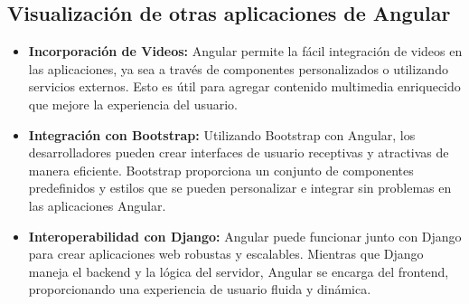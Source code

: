 \documentclass{article}
\begin{document}
  \subsection{Visualización de otras aplicaciones de Angular}
  \begin{itemize}
    \item \textbf{Incorporación de Videos:} Angular permite la fácil integración de videos en las aplicaciones, 
    ya sea a través de componentes personalizados o utilizando servicios externos. Esto es útil para agregar 
    contenido multimedia enriquecido que mejore la experiencia del usuario.
    \item \textbf{Integración con Bootstrap:} Utilizando Bootstrap con Angular, los desarrolladores pueden crear 
    interfaces de usuario receptivas y atractivas de manera eficiente. Bootstrap proporciona un conjunto de componentes 
    predefinidos y estilos que se pueden personalizar e integrar sin problemas en las aplicaciones Angular.
    \item \textbf{Interoperabilidad con Django:} Angular puede funcionar junto con Django para crear aplicaciones 
    web robustas y escalables. Mientras que Django maneja el backend y la lógica del servidor, Angular se encarga 
    del frontend, proporcionando una experiencia de usuario fluida y dinámica.
  \end{itemize}


\end{document}

